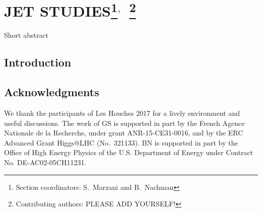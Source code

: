 \documentclass[11pt]{cernrep}
\begin{document}
\section{JET STUDIES\protect\footnote{Section coordinators: S.~Marzani and B.~Nachman}$^{,}$~\protect\footnote{Contributing authors: PLEASE ADD YOURSELF!}}

Short abstract

\subsection{Introduction}


\subsection*{Acknowledgments}

We thank the participants of Les Houches 2017 for a lively environment and useful discussions.
%
The work of GS is supported in part by the French Agence Nationale de la Recherche,
under grant ANR-15-CE31-0016, and by the ERC Advanced Grant Higgs@LHC
(No.\ 321133).
%
BN is supported in part by the Office of High Energy Physics of the U.S. Department of Energy under Contract No. DE-AC02-05CH11231.
%


\end{document}
